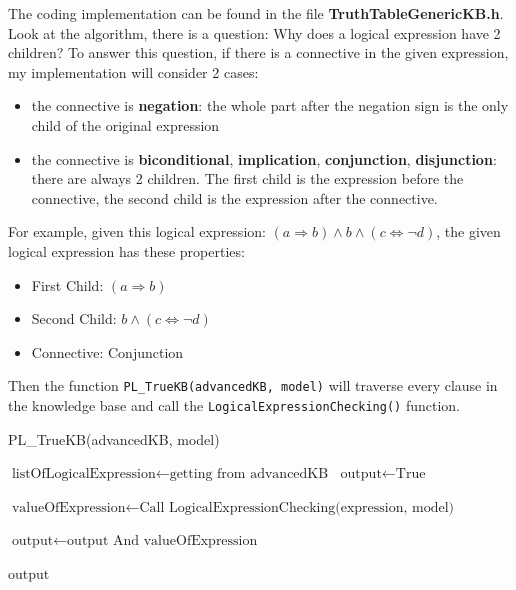 \documentclass{assignment}
\begin{document}
The coding implementation can be found in the file \textbf{TruthTableGenericKB.h}. Look at the algorithm, there is a question: Why does a logical expression have 2 children? To answer this question, if there is a connective in the given expression, my implementation will consider 2 cases:

\begin{itemize}
\item the connective is \textbf{negation}: the whole part after the negation sign is the only child of the original expression
\item the connective is \textbf{biconditional}, \textbf{implication}, \textbf{conjunction}, \textbf{disjunction}: there are always 2 children. The first child is the expression before the connective, the second child is the expression after the connective.
\end{itemize}

For example, given this logical expression: \( (a \Rightarrow b) \land b \land (c \iff \neg d) \), the given logical expression has these properties:

\begin{itemize}
\item First Child: $(a \Rightarrow b)$
\item Second Child: $b \land (c \iff \neg d)$
\item Connective: Conjunction
\end{itemize}


Then the function \texttt{PL\_TrueKB(advancedKB, model)} will traverse every clause in the knowledge base and call the \texttt{LogicalExpressionChecking()} function. 

\begin{algorithm}
\caption{PL\_TrueKB(advancedKB, model)}
\small
\begin{algorithmic}[1]
    \State $\text{listOfLogicalExpression} \gets \text{getting from advancedKB}$
    \State $\text{output} \gets \text{True}$
    
        \State $\text{valueOfExpression} \gets \text{Call LogicalExpressionChecking(expression, model)}$
        
        \State $\text{output} \gets \text{output And valueOfExpression}$
    \EndFor
    
    \State \Return $\text{output}$
\EndFunction
\end{algorithmic}
\end{algorithm}
\end{document}
